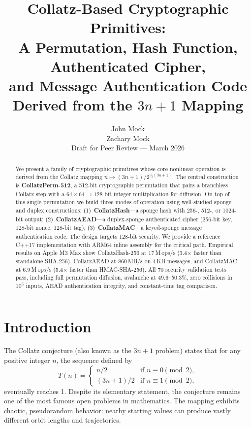 \documentclass[11pt,a4paper]{article}
\title{%
    \textbf{Collatz-Based Cryptographic Primitives:}\\[4pt]
    \large A Permutation, Hash Function, Authenticated Cipher,\\
    and Message Authentication Code\\
    Derived from the $3n+1$ Mapping
}
\author{
    John Mock\\[4pt]
    Zachary Mock\\[6pt]
    \small Draft for Peer Review --- March 2026
}
\date{}
\begin{document}
\maketitle

\begin{abstract}
We present a family of cryptographic primitives whose core nonlinear
operation is derived from the Collatz mapping
$n \mapsto (3n+1)/2^{\nu_2(3n+1)}$.
The central construction is \textbf{CollatzPerm-512}, a 512-bit
cryptographic permutation that pairs a branchless Collatz step with a
$64 \times 64 \to 128$-bit integer multiplication for diffusion. On top
of this single permutation we build three modes of operation using
well-studied sponge and duplex constructions:
(1)~\textbf{CollatzHash}---a sponge hash with 256-, 512-, or 1024-bit
output;
(2)~\textbf{CollatzAEAD}---a duplex-sponge authenticated cipher
(256-bit key, 128-bit nonce, 128-bit tag);
(3)~\textbf{CollatzMAC}---a keyed-sponge message authentication code.
The design targets 128-bit security. We provide a reference C++17
implementation with ARM64 inline assembly for the critical path.
Empirical results on Apple M3 Max show CollatzHash-256 at 17\,M\,ops/s
(3.4$\times$ faster than standalone SHA-256), CollatzAEAD at 860\,MB/s on
4\,KB messages, and CollatzMAC at 6.9\,M\,ops/s (5.4$\times$ faster than
HMAC-SHA-256). All 70 security validation tests pass, including full
permutation diffusion, avalanche at 49.6--50.3\%, zero collisions in
$10^6$ inputs, AEAD authentication integrity, and constant-time tag
comparison.
\end{abstract}

\tableofcontents
\newpage

\section{Introduction}

The Collatz conjecture (also known as the $3n+1$ problem) states that
for any positive integer $n$, the sequence defined by
\[
    T(n) = \begin{cases}
        n/2 & \text{if } n \equiv 0 \pmod{2},\\
        (3n+1)/2 & \text{if } n \equiv 1 \pmod{2},
    \end{cases}
\]
eventually reaches 1. Despite its elementary statement, the conjecture
remains one of the most famous open problems in mathematics. The mapping
exhibits chaotic, pseudorandom behavior: nearby starting values can
produce vastly different orbit lengths and trajectories.
\end{document}
